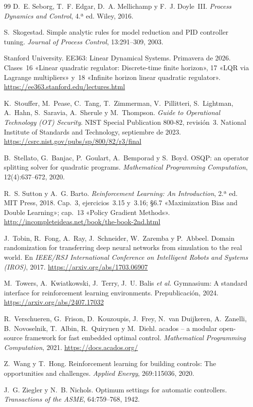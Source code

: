 \begin{thebibliography}{99}
D.~E. Seborg, T.~F. Edgar, D.~A. Mellichamp y F.~J. Doyle~III.
\newblock \emph{Process Dynamics and Control}, 4.ª ed.
\newblock Wiley, 2016.

S.~Skogestad.
\newblock Simple analytic rules for model reduction and PID controller tuning.
\newblock \emph{Journal of Process Control}, 13:291--309, 2003.

Stanford University.
\newblock EE363: Linear Dynamical Systems.
\newblock Primavera de 2026. Clases~16 «Linear quadratic regulator: Discrete-time finite horizon», 17 «LQR via Lagrange multipliers» y~18 «Infinite horizon linear quadratic regulator».
\newblock \url{https://ee363.stanford.edu/lectures.html}

K.~Stouffer, M.~Pease, C.~Tang, T.~Zimmerman, V.~Pillitteri, S.~Lightman, A.~Hahn, S.~Saravia, A.~Sherule y M.~Thompson.
\newblock \emph{Guide to Operational Technology (OT) Security}. NIST Special Publication 800-82, revisión~3.
\newblock National Institute of Standards and Technology, septiembre de 2023.
\newblock \url{https://csrc.nist.gov/pubs/sp/800/82/r3/final}

B.~Stellato, G.~Banjac, P.~Goulart, A.~Bemporad y S.~Boyd.
\newblock OSQP: an operator splitting solver for quadratic programs.
\newblock \emph{Mathematical Programming Computation}, 12(4):637--672, 2020.

R.~S. Sutton y A.~G. Barto.
\newblock \emph{Reinforcement Learning: An Introduction}, 2.ª ed.
\newblock MIT Press, 2018. Cap.~3, ejercicios~3.15 y~3.16; §6.7 «Maximization Bias and Double Learning»; cap.~13 «Policy Gradient Methods».
\newblock \url{http://incompleteideas.net/book/the-book-2nd.html}

J.~Tobin, R.~Fong, A.~Ray, J.~Schneider, W.~Zaremba y P.~Abbeel.
\newblock Domain randomization for transferring deep neural networks from simulation to the real world.
\newblock En \emph{IEEE/RSJ International Conference on Intelligent Robots and Systems (IROS)}, 2017.
\newblock \url{https://arxiv.org/abs/1703.06907}

M.~Towers, A.~Kwiatkowski, J.~Terry, J.~U. Balis \emph{et al.}
\newblock Gymnasium: A standard interface for reinforcement learning environments.
\newblock Prepublicación, 2024.
\newblock \url{https://arxiv.org/abs/2407.17032}

R.~Verschueren, G.~Frison, D.~Kouzoupis, J.~Frey, N.~van Duijkeren, A.~Zanelli, B.~Novoselnik, T.~Albin, R.~Quirynen y M.~Diehl.
\newblock acados -- a modular open-source framework for fast embedded optimal control.
\newblock \emph{Mathematical Programming Computation}, 2021.
\newblock \url{https://docs.acados.org/}

Z.~Wang y T.~Hong.
\newblock Reinforcement learning for building controls: The opportunities and challenges.
\newblock \emph{Applied Energy}, 269:115036, 2020.

J.~G. Ziegler y N.~B. Nichols.
\newblock Optimum settings for automatic controllers.
\newblock \emph{Transactions of the ASME}, 64:759--768, 1942.

\end{thebibliography}
